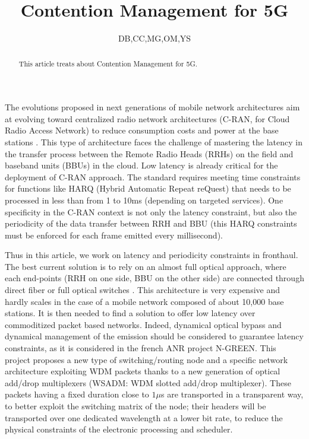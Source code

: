 \documentclass[a4paper,10pt]{article}
\title{Contention Management for 5G}
\author{DB,CC,MG,OM,YS}
\begin{document}
\maketitle

\begin{abstract}
This article treats about Contention Management for 5G.
\end{abstract}

The evolutions proposed in next generations of mobile network architectures aim at evolving toward centralized radio network architectures (C-RAN, for Cloud Radio Access Network) to reduce consumption costs and power at the base stations \cite{Mo11}. This type of architecture faces the challenge of mastering the latency in the transfer process between the Remote Radio Heads (RRHs) on the field and baseband units (BBUs) in the cloud. Low latency is already critical for the deployment of C-RAN approach. The standard requires meeting time constraints for functions like HARQ (Hybrid Automatic Repeat reQuest) that needs to be processed in less than from 1 to 10ms \cite{BM12}
(depending on targeted services). One specificity in the C-RAN context is not only the latency constraint, but also the periodicity of the data transfer between RRH and BBU (this HARQ constraints must be enforced for each frame emitted every millisecond).

 Thus in this article, we work on latency and periodicity constraints in fronthaul.  The best current solution is to rely on an almost full optical approach, where each end-points (RRH on one side, BBU on the other side) are connected through direct fiber or full optical switches \cite{GPA16}. This architecture is very expensive and hardly scales in the case of a mobile network composed of about 10,000 base stations.  It is then needed to find a solution to offer low latency over commoditized packet based networks. Indeed,  dynamical optical bypass and dynamical management of the emission should be considered to guarantee latency constraints, as it is considered in the french ANR project N-GREEN. This project proposes a new type of switching/routing node and a specific network architecture exploiting WDM packets thanks to a new generation of optical add/drop multiplexers (WSADM: WDM slotted add/drop multiplexer). These packets having a fixed duration close to $1\mu $s are transported in a transparent way, to better exploit the switching matrix of the node; their headers will be transported over one dedicated wavelength at a lower bit rate, to reduce the physical constraints of the electronic processing and scheduler.\\
\end{document}
